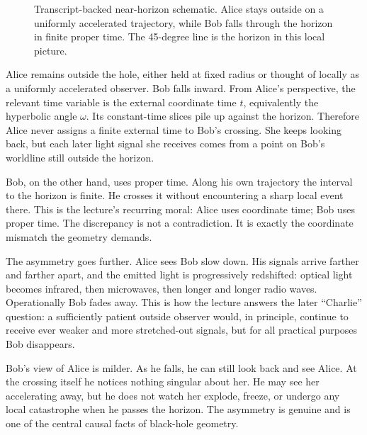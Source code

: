 \begin{figure}[h]
\centering
{}
\caption{Transcript-backed near-horizon schematic. Alice stays outside on a uniformly accelerated trajectory, while Bob falls through the horizon in finite proper time. The 45-degree line is the horizon in this local picture.}
\end{figure}

Alice remains outside the hole, either held at fixed radius or thought of locally as a uniformly accelerated observer. Bob falls inward. From Alice's perspective, the relevant time variable is the external coordinate time \(t\), equivalently the hyperbolic angle \(\omega\). Its constant-time slices pile up against the horizon. Therefore Alice never assigns a finite external time to Bob's crossing. She keeps looking back, but each later light signal she receives comes from a point on Bob's worldline still outside the horizon.

Bob, on the other hand, uses proper time. Along his own trajectory the interval to the horizon is finite. He crosses it without encountering a sharp local event there. This is the lecture's recurring moral: Alice uses coordinate time; Bob uses proper time. The discrepancy is not a contradiction. It is exactly the coordinate mismatch the geometry demands.

The asymmetry goes further. Alice sees Bob slow down. His signals arrive farther and farther apart, and the emitted light is progressively redshifted: optical light becomes infrared, then microwaves, then longer and longer radio waves. Operationally Bob fades away. This is how the lecture answers the later ``Charlie'' question: a sufficiently patient outside observer would, in principle, continue to receive ever weaker and more stretched-out signals, but for all practical purposes Bob disappears.

Bob's view of Alice is milder. As he falls, he can still look back and see Alice. At the crossing itself he notices nothing singular about her. He may see her accelerating away, but he does not watch her explode, freeze, or undergo any local catastrophe when he passes the horizon. The asymmetry is genuine and is one of the central causal facts of black-hole geometry.

